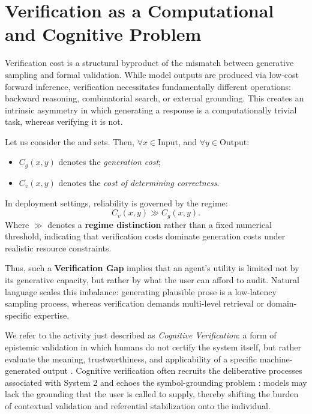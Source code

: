 \documentclass[11pt]{article}
\newcommand{\cfix}[1]{\textcolor{green!50!black}{#1}}
\newcommand{\cfix}[1]{#1}
\begin{document}
\section{Verification as a Computational and Cognitive Problem}
\label{sec:cognitive-problem}

Verification cost is a structural byproduct of the mismatch between generative sampling and formal validation.
While model outputs are produced via low-cost forward inference, verification necessitates fundamentally different operations: backward reasoning, combinatorial search, or external grounding.
This creates an intrinsic asymmetry
{in which generating a response is a computationally trivial task, whereas verifying it is not.}

{Let us consider the  and  sets.
Then, $\forall x \in \text{Input}$, and
$\forall y \in \text{Output}$:}
\begin{itemize}
    \item {$C_g(x,y)$ denotes the \emph{generation cost};}
    \item {$C_v(x,y)$ denotes the \emph{cost of determining correctness}.}

\end{itemize}
{In deployment settings, reliability is governed by the regime:}
\begin{equation}
    C_v(x,y) \gg C_g(x,y).
\end{equation}
Where $\gg $ denotes a \textbf{regime distinction} rather than a fixed numerical threshold, indicating that verification costs dominate generation costs under realistic resource constraints.

{Thus, such a} \textbf{Verification Gap} implies that an agent's utility is limited not by its generative capacity, but rather by what the user can afford to audit.
Natural language scales this imbalance: generating plausible prose is a low-latency sampling process, whereas verification demands multi-level retrieval or domain-specific expertise.

We refer to the activity just described as \textit{Cognitive Verification}: a form of epistemic validation in which humans do not certify the system itself, but rather evaluate the meaning, trustworthiness, and applicability of a specific machine-generated output \citep{Immediato2025-POM}.
\cfix{Cognitive verification often recruits the deliberative processes associated with System 2} \citep{kahneman2011} and echoes the symbol-grounding problem \citep{harnad1990}: models may lack the grounding that the user is called to supply, {thereby shifting the burden of contextual validation and referential stabilization onto the individual.}
\end{document}
